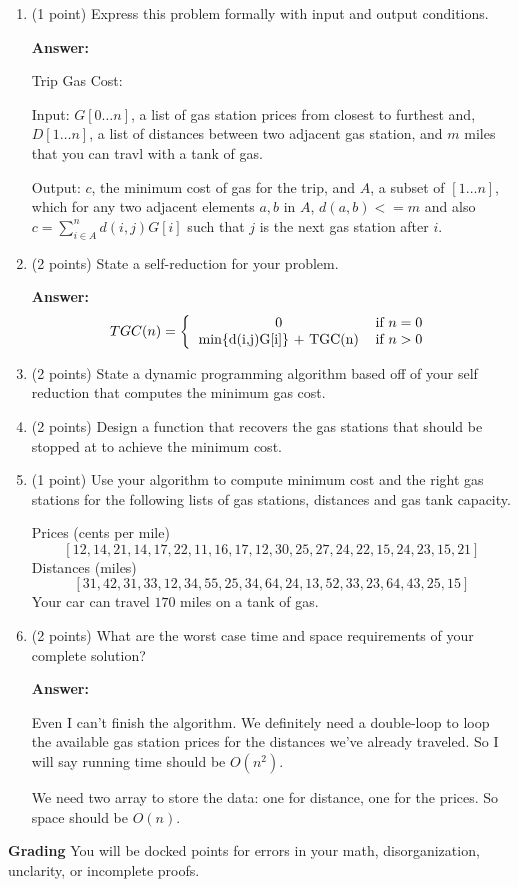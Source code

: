 \documentclass[paper=a4, fontsize=11pt]{scrartcl}
\numberwithin{equation}{section}		%
\numberwithin{figure}{section}			%
\numberwithin{table}{section}				%
\begin{document}
\begin{enumerate}
\item (1 point) Express this problem formally with input and output conditions.

\textbf{Answer:}

Trip Gas Cost: 

Input: $G[0\dots n]$, a list of gas station prices from closest to furthest and, $D[1\dots n]$, a list of distances between two adjacent gas station, and $m$ miles that you can travl with a tank of gas.

Output: $c$, the minimum cost of gas for the trip, and $A$, a subset of $[1 \dots n]$, which for any two adjacent elements $a, b$ in $A$, $d(a, b) <= m$ and also $c = \displaystyle\sum_{i \in A}^n d(i,j)G[i]$ such that $j$ is the next gas station after $i$.

\item (2 points) State a self-reduction for your problem.

\textbf{Answer:}
\[
TGC(n) = \left\{
\begin{tabular}{cc}
0 & \text{if} $n=0$ \\
min\{d(i,j)G[i]\} + TGC(n) & \text{if} $n>0$ \\
\end{tabular}\right.
\]

\item (2 points) State a dynamic programming algorithm based off of your self reduction that computes the minimum gas cost.



\item (2 points) Design a function that recovers the gas stations that should be stopped at to achieve the minimum cost.



\item (1 point) Use your algorithm to compute minimum cost and the right gas stations for the following lists of gas stations, distances and gas tank capacity.

Prices (cents per mile)
\[
[12,14,21,14,17,22,11,16,17,12,30,25,27,24,22,15,24,23,15,21]
\]
Distances (miles)
\[
[31,42,31,33,12,34,55,25,34,64,24,13,52,33,23,64,43,25,15]
\]
Your car can travel $170$ miles on a tank of gas.

\item (2 points) What are the worst case time and space requirements of your complete solution?

\textbf{Answer:}

Even I can't finish the algorithm. We definitely need a double-loop to loop the available gas station prices for the distances we've already traveled. So I will say running time should be $O(n^2)$.

We need two array to store the data: one for distance, one for the prices. So space should be $O(n)$. 


\end{enumerate}

\noindent\textbf{Grading} You will be docked points for errors in your math, disorganization, unclarity, or incomplete proofs. 
\end{document}
